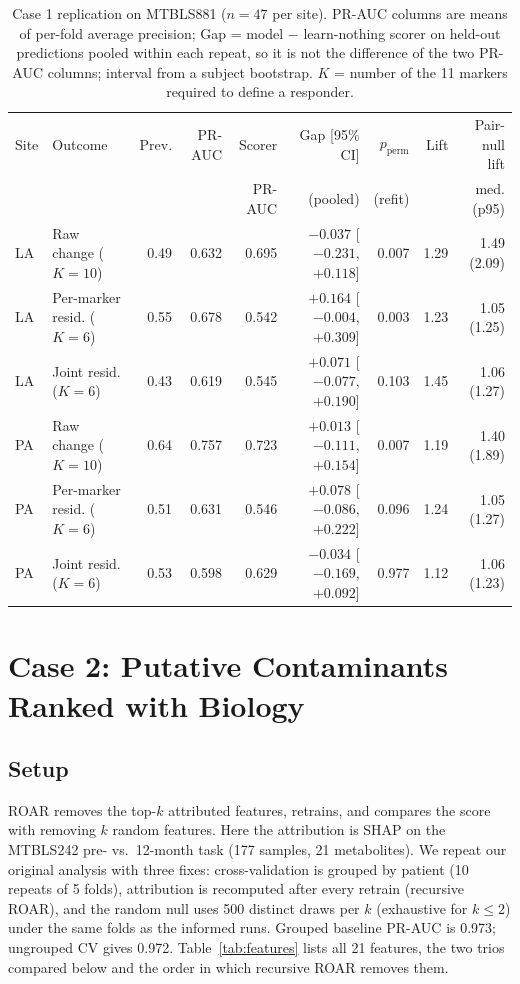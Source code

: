\documentclass[conference]{IEEEtran}
\newcommand{\verified}[1]{#1}  %
\begin{document}
\begin{table}[t]
\centering
\caption{Case 1 replication on MTBLS881 ($n=47$ per site). PR-AUC columns are
means of per-fold average precision; Gap = model $-$ learn-nothing scorer on
held-out predictions pooled within each repeat, so it is not the difference
of the two PR-AUC columns; interval from a subject bootstrap. $K$ = number of
the 11 markers required to define a responder.}
\label{tab:case1b}
\footnotesize
\begin{tabular}{llrrrrrrr}
\toprule
Site & Outcome & Prev. & PR-AUC & Scorer & Gap [95\% CI] & $p_{\mathrm{perm}}$ & Lift & Pair-null lift \\
 & & & & PR-AUC & (pooled) & (refit) & & med. (p95) \\
\midrule
LA & Raw change ($K{=}10$) & 0.49 & 0.632 & 0.695 & $-0.037$ [$-0.231$, $+0.118$] & 0.007 & 1.29 & 1.49 (2.09) \\
LA & Per-marker resid. ($K{=}6$) & 0.55 & 0.678 & 0.542 & $+0.164$ [$-0.004$, $+0.309$] & 0.003 & 1.23 & 1.05 (1.25) \\
LA & Joint resid. ($K{=}6$) & 0.43 & 0.619 & 0.545 & $+0.071$ [$-0.077$, $+0.190$] & 0.103 & 1.45 & 1.06 (1.27) \\
\midrule
PA & Raw change ($K{=}10$) & 0.64 & 0.757 & 0.723 & $+0.013$ [$-0.111$, $+0.154$] & 0.007 & 1.19 & 1.40 (1.89) \\
PA & Per-marker resid. ($K{=}6$) & 0.51 & 0.631 & 0.546 & $+0.078$ [$-0.086$, $+0.222$] & 0.096 & 1.24 & 1.05 (1.27) \\
PA & Joint resid. ($K{=}6$) & 0.53 & 0.598 & 0.629 & $-0.034$ [$-0.169$, $+0.092$] & 0.977 & 1.12 & 1.06 (1.23) \\
\bottomrule
\end{tabular}
\end{table}

\section{Case 2: Putative Contaminants Ranked with Biology}
\label{sec:case2}

\subsection{Setup}
ROAR \cite{hooker2019} removes the top-$k$ attributed features, retrains, and
compares the score with removing $k$ random features. Here the attribution is
SHAP on the MTBLS242 pre- vs.\ 12-month task (177 samples, 21 metabolites).
We repeat our original analysis with three fixes: cross-validation is grouped
by patient (10 repeats of 5 folds), attribution is recomputed after every
retrain (recursive ROAR), and the random null uses 500 distinct draws per $k$
(exhaustive for $k\leq 2$) under the same folds as the informed runs.
Grouped baseline PR-AUC is \verified{0.973}; ungrouped CV gives
\verified{0.972}.
Table~\ref{tab:features} lists all 21 features, the two trios compared below
and the order in which recursive ROAR removes them.
\end{document}
